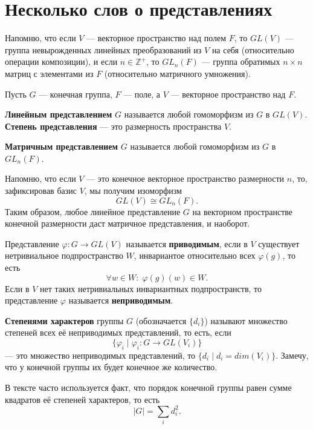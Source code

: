 \section{Несколько слов о представлениях}\label{representation}

Напомню, что если $V$ --- векторное пространство над полем $F$, то $GL(V)$ --- группа невырожденных линейных преобразований из $V$ на себя (относительно операции композиции), и если $n \in \mathbb{Z}^+$, то $GL_n(F)$ --- группа обратимых $n \times n$ матриц с элементами из $F$ (относительно матричного умножения).

Пусть $G$ --- конечная группа, $F$ --- поле, а $V$ --- векторное пространство над $F$.
\begin{definition}
  \textbf{Линейным представлением} $G$ называется любой гомоморфизм из $G$ в $GL(V)$. \textbf{Степень представления} --- это размерность пространства $V$.
\end{definition}
\begin{definition}
  \textbf{Матричным представлением} $G$ называется любой гомоморфизм из $G$ в $GL_n(F)$.
\end{definition}

Напомню, что если $V$ --- это конечное векторное пространство размерности $n$, то, зафиксировав базис $V$, мы получим изоморфизм 
\[
	GL(V) \cong GL_n(F).	
\]
Таким образом, любое линейное представление $G$ на векторном пространстве конечной размерности даст матричное представления, и наоборот. 

\begin{definition}
  Представление $\varphi: G \to GL(V)$ называется \textbf{приводимым}, если в $V$ существует нетривиальное подпространство $W$, инвариантое относительно всех $\varphi(g)$, то есть 
  \[
  	\forall w \in W: \; \varphi(g)(w) \in W.
  \]
  Если в $V$ нет таких нетривиальных инвариантных подпространств, то представление $\varphi$ называется \textbf{неприводимым}.
\end{definition}
\begin{definition}\label{def:characters_degree}
  \textbf{Степенями характеров} группы $G$ (обозначается $\{ d_i \}$) называют множество степеней всех её неприводимых представлений, то есть, если 
  \[
  	\{ \varphi_i \mid \varphi_i: G \to GL(V_i) \}
  \] --- это множество неприводимых представлений, то $\{ d_i \mid d_i = dim(V_i) \}$. Замечу, что у конечной группы их будет конечное же количество.
\end{definition}

В тексте часто используется факт, что порядок конечной группы равен сумме квадратов её степеней характеров, то есть
\[
	|G|=\sum\limits_i d_i^2.
\]
